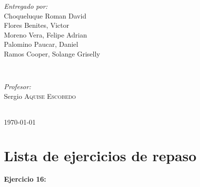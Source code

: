 \documentclass[12pt]{article}
\begin{document}
\begin{titlepage}
\begin{minipage}{0.4\textwidth}
\begin{flushleft} \large
\emph{Entregado por:}\\
Choqueluque Roman David\\Flores Benites, Victor \\Moreno Vera, Felipe Adrian \\Palomino Paucar, Daniel \\Ramos Cooper, Solange Griselly\\%
\end{flushleft}
\end{minipage}
~
\begin{minipage}{0.4\textwidth}
\begin{flushright} \large
\emph{Profesor:} \\
Sergio \textsc{Aquise Escobedo} %
\end{flushright}
\end{minipage}\\[2cm]



{\large \today}\\[2cm] %

\vfill %

\end{titlepage}

\newpage

%
\section{Lista de ejercicios de repaso}

%
\noindent \textbf{Ejercicio 16:}
\end{document}
